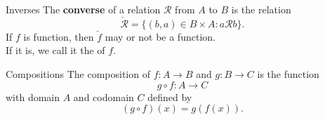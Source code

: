 \documentclass{beamer}
\begin{document}
\begin{frame}{Inverses}
The \textbf{converse} of a relation $\mathcal R$ from $A$ to $B$ is the relation
\pause
$$\check{\mathcal R} = \{(b,a)\in B\times A: a\mathcal R b\}.$$
\pause
If $f$ is  function, then $\check f$ may or not be a function.\\
\pause
If it is, we call it the  of $f$.
\end{frame}

\begin{frame}{Compositions}
The composition of $f: A\rightarrow B$ and $g: B\rightarrow C$ is the function
\pause
$$g\circ f: A\rightarrow C$$
\pause
with domain $A$ and codomain $C$ defined by
\pause
$$(g\circ f)(x)  = g(f(x)).$$
\end{frame}
\end{document}
